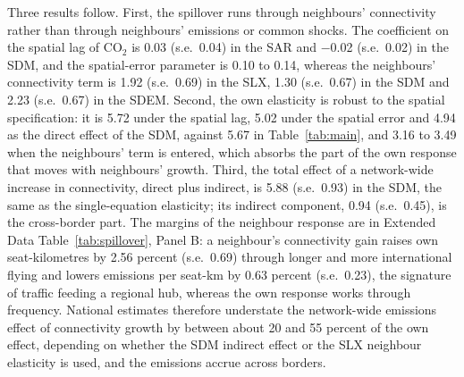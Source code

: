 \documentclass[12pt]{article}
\begin{document}
Three results follow. First, the spillover runs through neighbours'
connectivity rather than through neighbours' emissions or common shocks.
The coefficient on the spatial lag of CO$_2$ is 0.03 (s.e.\ 0.04) in
the SAR and $-$0.02 (s.e.\ 0.02) in the SDM, and the spatial-error
parameter is 0.10 to 0.14, whereas the neighbours' connectivity term is
1.92 (s.e.\ 0.69) in the SLX, 1.30 (s.e.\ 0.67) in the SDM and
2.23 (s.e.\ 0.67) in the SDEM. Second, the own elasticity is robust to
the spatial specification: it is 5.72 under the spatial lag, 5.02 under
the spatial error and 4.94 as the direct effect of the SDM, against 5.67
in Table~\ref{tab:main}, and 3.16 to 3.49 when the neighbours' term is entered,
which absorbs the part of the own response that moves with neighbours'
growth. Third, the total effect of a network-wide increase in
connectivity, direct plus indirect, is 5.88 (s.e.\ 0.93) in the SDM, the
same as the single-equation elasticity; its indirect component,
0.94 (s.e.\ 0.45), is the cross-border part. The margins of the
neighbour response are in Extended Data Table~\ref{tab:spillover}, Panel
B: a neighbour's connectivity gain raises own seat-kilometres by 2.56
percent (s.e.\ 0.69) through longer and more international flying and
lowers emissions per seat-km by 0.63 percent (s.e.\ 0.23), the signature
of traffic feeding a regional hub, whereas the own response works through
frequency. National estimates therefore understate the network-wide
emissions effect of connectivity growth by between about
20 and 55 percent of the own effect, depending on whether the SDM
indirect effect or the SLX neighbour elasticity is used, and the emissions
accrue across borders.
\end{document}

